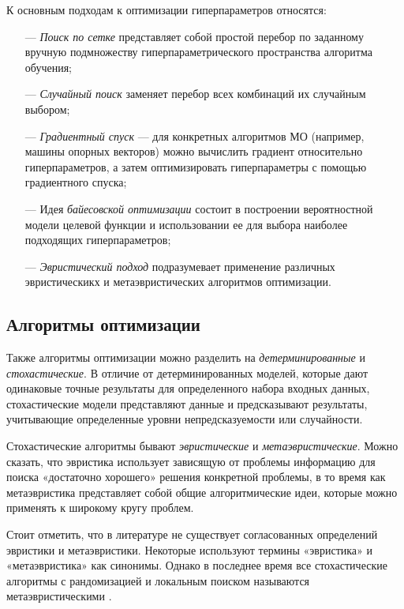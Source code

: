 К основным подходам к оптимизации гиперпараметров относятся:

\begin{itemize}
    \item[—] \emph{Поиск по сетке} представляет собой простой перебор
        по заданному вручную подмножеству гиперпараметрического пространства
        алгоритма обучения;
    \item[—] \emph{Случайный поиск} заменяет перебор всех комбинаций их случайным выбором;
    \item[—] \emph{Градиентный спуск} — для конкретных алгоритмов МО (например, машины опорных векторов)
        можно вычислить градиент относительно гиперпараметров, а затем
        оптимизировать гиперпараметры с помощью градиентного спуска;
    \item[—] Идея \emph{байесовской оптимизации} состоит в построении
        вероятностной модели целевой функции и использовании ее для выбора
        наиболее подходящих гиперпараметров;
    \item[—] \emph{Эвристический подход} подразумевает применение различных эвристическикх и
        метаэвристических алгоритмов оптимизации.
\end{itemize}

\subsection{Алгоритмы оптимизации}

Также алгоритмы оптимизации можно разделить на \emph{детерминированные} и
\emph{стохастические}. В отличие от детерминированных моделей,
которые дают одинаковые точные результаты для определенного набора
входных данных, стохастические модели представляют данные и
предсказывают результаты, учитывающие определенные уровни
непредсказуемости или случайности.

Стохастические алгоритмы бывают \emph{эвристические} и \emph{метаэвристические}.
Можно сказать, что эвристика использует зависящую от проблемы информацию
для поиска «достаточно хорошего» решения конкретной проблемы, в
то время как метаэвристика представляет собой общие алгоритмические
идеи, которые можно применять к широкому кругу проблем.

Стоит отметить, что в литературе не существует согласованных определений
эвристики и метаэвристики. Некоторые используют термины «эвристика» и
«метаэвристика» как синонимы. Однако в последнее время все стохастические
алгоритмы с рандомизацией и локальным поиском называются
метаэвристическими \cite{Yang2009}.

